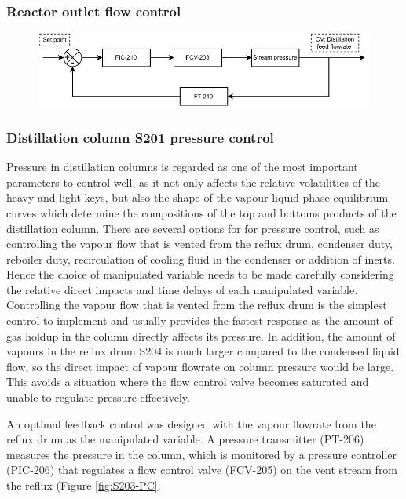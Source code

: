 \subsubsection{Reactor outlet flow control}
\begin{figure}[H]
    \centering
    \includegraphics[width=\linewidth]{chapters/4-operation-control/4-Figures/V201-FC.pdf}
    \caption{}
    \label{fig:V201-FC}
\end{figure}


\subsubsection{Distillation column S201 pressure control}
Pressure in distillation columns is regarded as one of the most important parameters to control well, as it not only affects the relative volatilities of the heavy and light keys, but also the shape of the vapour-liquid phase equilibrium curves which determine the compositions of the top and bottoms products of the distillation column. There are several options for for pressure control, such as controlling the vapour flow that is vented from the reflux drum, condenser duty, reboiler duty, recirculation of cooling fluid in the condenser or addition of inerts. Hence the choice of manipulated variable needs to be made carefully considering the relative direct impacts and time delays of each manipulated variable. Controlling the vapour flow that is vented from the reflux drum is the simplest control to implement and usually provides the fastest response as the amount of gas holdup in the column directly affects its pressure. In addition, the amount of vapours in the reflux drum S204 is much larger compared to the condensed liquid flow, so the direct impact of vapour flowrate on column pressure would be large. This avoids a situation where the flow control valve becomes saturated and unable to regulate pressure effectively. 

An optimal feedback control was designed with the vapour flowrate from the reflux drum as the manipulated variable. A pressure transmitter (PT-206) measures the pressure in the column, which is monitored by a pressure controller (PIC-206) that regulates a flow control valve (FCV-205) on the vent stream from the reflux (Figure \ref{fig:S203-PC}.

